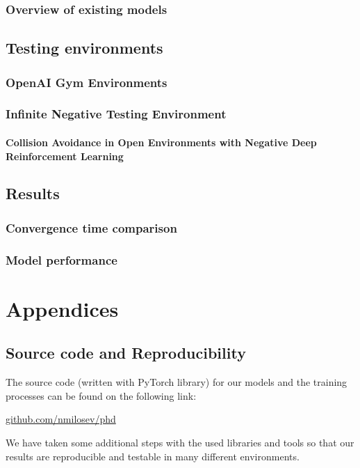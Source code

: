 \documentclass[b5paper]{book}
\begin{document}
\section{Overview of existing models}

\chapter{Testing environments}
\section{OpenAI Gym Environments}
\section{Infinite Negative Testing Environment}
\subsection{Collision Avoidance in Open Environments with Negative Deep Reinforcement Learning}

\chapter{Results}
\section{Convergence time comparison}
\section{Model performance}

\part{Appendices}
\chapter{Source code and Reproducibility}
\label{source}

The source code (written with PyTorch library) for our models and the training processes can be found on the following link: 

\begin{footnotesize}
\url{github.com/nmilosev/phd}
\end{footnotesize}

We have taken some additional steps with the used libraries and tools so that our results are reproducible and testable in many different environments.
\end{document}
